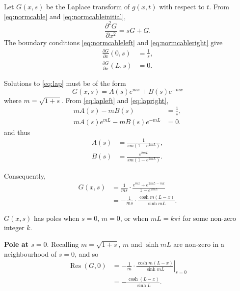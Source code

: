\documentclass[parskip=half]{scrartcl}
\DeclareMathOperator{\Res}{Res}
\begin{document}
Let $G(x, s)$ be the Laplace transform of $g(x, t)$ with respect to $t$. From
\eqref{eq:normcable} and \eqref{eq:normcableinitial},
\begin{equation}
    \label{eq:lap}
    \frac{\partial^2 G}{\partial x^2} = sG + G.
\end{equation}
The boundary conditions \eqref{eq:normcableleft} and \eqref{eq:normcableright} give
\begin{align}
    \label{eq:lapleft}
    \frac{\partial G}{\partial x}(0, s) & = \frac{1}{s},
    \\
    \label{eq:lapright}
    \frac{\partial G}{\partial x}(L, s) & = 0.
\end{align}

Solutions to \eqref{eq:lap} must be of the form
\begin{equation}
    G(x, s) = A(s) e^{mx} +B(s) e^{-mx}
\end{equation}
where $m=\sqrt{1+s}$. From \eqref{eq:lapleft} and \eqref{eq:lapright},
\begin{align*}
    mA(s) - mB(s) & = \frac{1}{s},
    \\
    mA(s)e^{mL} -mB(s)e^{-mL} & = 0.
\end{align*} and thus
\begin{align*}
    A(s) & = \frac{1}{sm (1-e^{2mL})},
    \\
    B(s) & = \frac{e^{2mL}}{sm (1-e^{2mL})}.
\end{align*}

Consequently,
\begin{equation}
    \begin{aligned}
	G(x, s) &= \frac{1}{ms}\cdot\frac{e^{mx}+e^{2mL-mx}}{1-e^{2mL}}\\
                &= - \frac{1}{ms}\cdot\frac{\cosh m(L-x)}{\sinh mL}.
    \end{aligned}
\end{equation}

$G(x, s)$ has poles when $s=0$, $m=0$, or when $mL = k\pi i$ for some non-zero
integer $k$.

\textbf{Pole at $s=0$}. Recalling $m=\sqrt{1+s}$, $m$ and $\sinh mL$ are non-zero in
a neighbourhood of $s=0$, and so
\begin{equation}
    \begin{aligned}
	\Res(G, 0) & = - \frac{1}{m}\cdot\left.\frac{\cosh m(L-x)}{\sinh mL}\right|_{s=0}\\
		   & = - \frac{\cosh (L-x)}{\sinh L}.
    \end{aligned}
\end{equation}

%

\printbibliography
\end{document}
